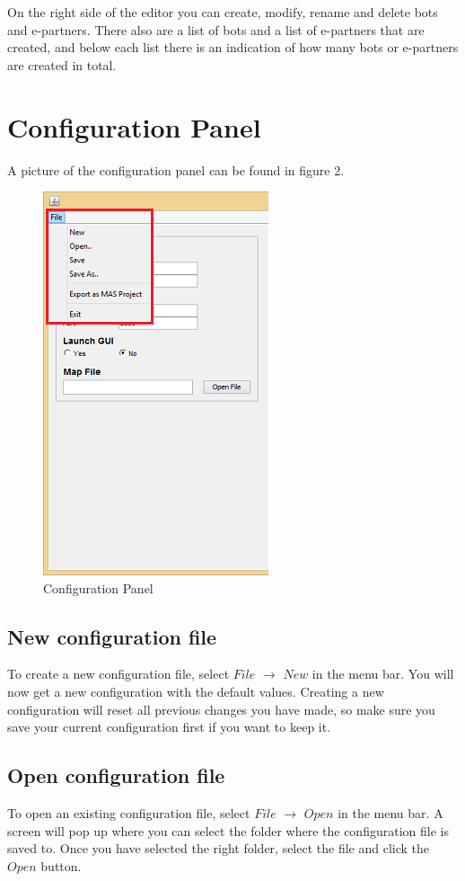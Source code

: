\documentclass[a4paper]{article}
\begin{document}
On the right side of the editor you can create, modify, rename and delete bots and e-partners. There also are a list of bots and a list of e-partners that are created, and below each list there is an indication of how many bots or e-partners are created in total.
\pagebreak
\section{Configuration Panel}
A picture of the configuration panel can be found in figure 2.
\begin{figure}[h]
\begin{center}
\includegraphics{config.png}
\end{center}
\caption{Configuration Panel}
\end{figure}
\subsection{New configuration file}
To create a new configuration file, select $File$ $\to$ $New$ in the menu bar. You will now get a new configuration with the default values. Creating a new configuration will reset all previous changes you have made, so make sure you save your current configuration first if you want to keep it.

\subsection{Open configuration file}
To open an existing configuration file, select $File$ $\to$ $Open$ in the menu bar. A screen will pop up where you can select the folder where the configuration file is saved to. Once you have selected the right folder, select the file and click the $Open$ button.
\end{document}
